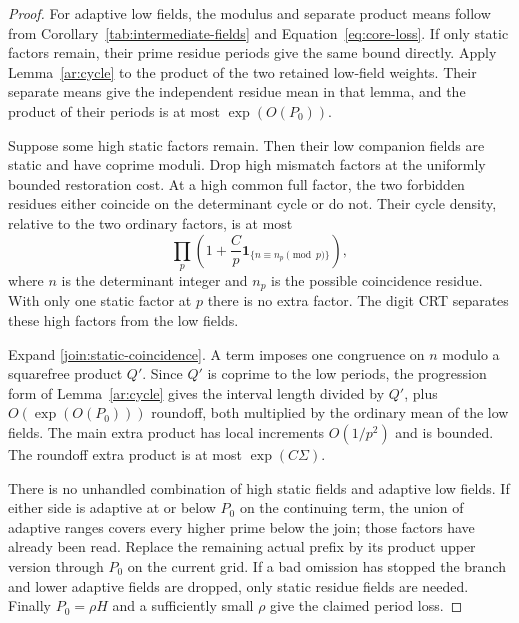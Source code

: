 \begin{proof}
For adaptive low fields, the modulus and separate product means follow
from Corollary~\ref{tab:intermediate-fields} and
Equation~\eqref{eq:core-loss}. If only static factors remain, their prime
residue periods give the same bound directly.
Apply Lemma~\ref{ar:cycle} to the product of the two retained low-field
weights. Their separate means give the independent residue mean in that
lemma, and the product of their periods is at most $\exp(O(P_0))$.

Suppose some high static factors remain. Then their low companion
fields are static and have coprime moduli. Drop high mismatch factors
at the uniformly bounded restoration cost. At a high common full
factor, the two forbidden residues either coincide on the determinant
cycle or do not. Their cycle density, relative to the two ordinary
factors, is at most
\begin{equation}\label{join:static-coincidence}
 \prod_p\left(1+\frac Cp
       \mathbf 1_{\{n\equiv n_p\pmod p\}}\right),
\end{equation}
where $n$ is the determinant integer and $n_p$ is the possible
coincidence residue. With only one static factor at $p$ there is no
extra factor. The digit CRT separates these high factors from the low
fields.

Expand \eqref{join:static-coincidence}. A term imposes one congruence
on $n$ modulo a squarefree product $Q'$. Since $Q'$ is coprime to the
low periods, the progression form of Lemma~\ref{ar:cycle} gives the interval length
divided by $Q'$, plus $O(\exp(O(P_0)))$ roundoff, both multiplied by
the ordinary mean of the low fields. The main extra product has local
increments $O(1/p^2)$ and is bounded. The roundoff extra product is at
most $\exp(C\Sigma)$.

There is no unhandled combination of high static fields and adaptive
low fields. If either side is adaptive at or below $P_0$ on the
continuing term, the union of adaptive ranges covers every higher
prime below the join; those factors have already been read. Replace
the remaining actual prefix by its product upper version through
$P_0$ on the current grid. If a bad omission has stopped the branch
and lower adaptive fields are dropped, only static residue fields are
needed. Finally $P_0=\rho H$ and a sufficiently small $\rho$ give the
claimed period loss.
\end{proof}

